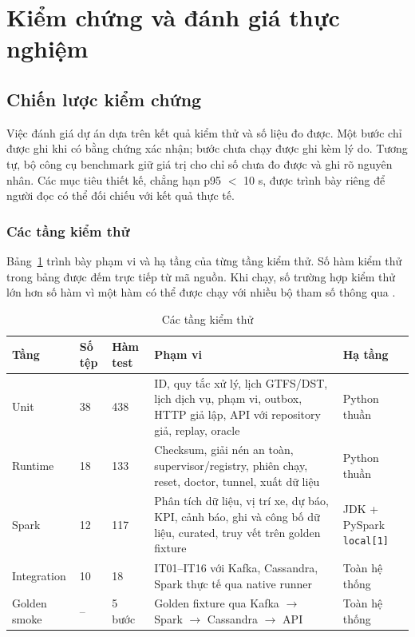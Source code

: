 \section{Kiểm chứng và đánh giá thực nghiệm}
\label{sec:experiments}

\subsection{Chiến lược kiểm chứng}

Việc đánh giá dự án dựa trên kết quả kiểm thử và số liệu đo được. Một bước chỉ được ghi  khi có bằng chứng xác nhận; bước chưa chạy được ghi  kèm lý do. Tương tự, bộ công cụ benchmark giữ giá trị  cho chỉ số chưa đo được và ghi rõ nguyên nhân. Các mục tiêu thiết kế, chẳng hạn p95 $<$ 10 s, được trình bày riêng để người đọc có thể đối chiếu với kết quả thực tế.

\subsubsection{Các tầng kiểm thử}

Bảng~\ref{tab:testlayers} trình bày phạm vi và hạ tầng của từng tầng kiểm thử. Số hàm kiểm thử trong bảng được đếm trực tiếp từ mã nguồn. Khi chạy, số trường hợp kiểm thử lớn hơn số hàm vì một hàm có thể được chạy với nhiều bộ tham số thông qua .

\begin{table}[H]
\centering
\tablefont
\caption{Các tầng kiểm thử}
\label{tab:testlayers}
\begin{tabular}{p{2.21cm}p{1.19cm}p{1.38cm}p{5.90cm}p{3.32cm}}
\toprule
\textbf{Tầng} & \textbf{Số tệp} & \textbf{Hàm test} & \textbf{Phạm vi} & \textbf{Hạ tầng} \\
\midrule
Unit & 38 & 438 & ID, quy tắc xử lý, lịch GTFS/DST, lịch dịch vụ, phạm vi, outbox, HTTP giả lập, API với repository giả, replay, oracle & Python thuần \\
Runtime & 18 & 133 & Checksum, giải nén an toàn, supervisor/registry, phiên chạy, reset, doctor, tunnel, xuất dữ liệu & Python thuần \\
Spark & 12 & 117 & Phân tích dữ liệu, vị trí xe, dự báo, KPI, cảnh báo, ghi và công bố dữ liệu, curated, truy vết trên golden fixture & JDK + PySpark \texttt{local[1]} \\
Integration & 10 & 18 & IT01--IT16 với Kafka, Cassandra, Spark thực tế qua native runner & Toàn hệ thống \\
Golden smoke & -- & 5 bước & Golden fixture qua Kafka $\rightarrow$ Spark $\rightarrow$ Cassandra $\rightarrow$ API & Toàn hệ thống \\
\bottomrule
\end{tabular}
\end{table}

